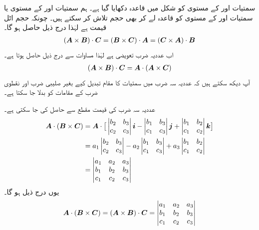 سمتیات  اور  کے مستوی کو شکل  میں قاعدہ دکھایا گیا ہے۔ ہم
سمتیات  اور  کے مستوی یا  سمتیات  اور  کے مستوی کو قاعدہ لے کر بھی حجم تلاش کر سکتے ہیں۔ چونکہ حجم اٹل قیمت ہے لہٰذا درج ذیل حاصل ہو گا۔
\begin{align}\label{مساوات_سمتیہ_حجم_کی_مساوات}
({{\boldsymbol{A}}}\times{\ensuremath{{\boldsymbol{B}}}})\cdot{\ensuremath{{\boldsymbol{C}}}}=({{\boldsymbol{B}}}\times{\ensuremath{{\boldsymbol{C}}}})\cdot{\ensuremath{{\boldsymbol{A}}}}=({{\boldsymbol{C}}}\times{\ensuremath{{\boldsymbol{A}}}})\cdot{\ensuremath{{\boldsymbol{B}}}}
\end{align}
اب عددیہ ضرب تعویضی ہے لہٰذا مساوات  سے درج ذیل حاصل ہوتا ہے۔
\begin{align}
({{\boldsymbol{A}}}\times{\ensuremath{{\boldsymbol{B}}}})\cdot{\ensuremath{{\boldsymbol{C}}}}={{\boldsymbol{A}}}\cdot({{\boldsymbol{A}}}\times{\ensuremath{{\boldsymbol{C}}}})
\end{align}
آپ دیکھ سکتے ہیں کہ عددیہ سہ ضرب میں سمتیات کا مقام تبدیل کیے بغیر صلیبی ضرب اور نقطوی ضرب کے مقامات کو بدلا جا سکتا ہے۔

عددیہ سہ ضرب کی قیمت مقطع سے حاصل کی جا سکتی ہے۔
\begin{align*}
{\ensuremath{{\boldsymbol{A}}}}\cdot({{\boldsymbol{B}}}\times{\ensuremath{{\boldsymbol{C}}}})&={{\boldsymbol{A}}}\cdot\big[ \begin{vmatrix}  b_2&b_3\\c_2&c_3\end{vmatrix}{\boldsymbol{i}}-\begin{vmatrix}b_1&b_3\\c_1&c_3\end{vmatrix}{\boldsymbol{j}}+\begin{vmatrix}b_1&b_2\\c_1&c_2\end{vmatrix}{\boldsymbol{k}}\big]\\
&=a_1\begin{vmatrix}  b_2&b_3\\c_2&c_3\end{vmatrix}-a_2\begin{vmatrix}b_1&b_3\\c_1&c_3\end{vmatrix}+a_3\begin{vmatrix}b_1&b_2\\c_1&c_2\end{vmatrix}\\
&=\begin{vmatrix}a_1&a_2&a_3\\b_1&b_2&b_3\\c_1&c_2&c_3\end{vmatrix}
\end{align*}
یوں درج ذیل ہو گا۔
\begin{align}
{\ensuremath{{\boldsymbol{A}}}}\cdot({{\boldsymbol{B}}}\times{\ensuremath{{\boldsymbol{C}}}})=({{\boldsymbol{A}}}\times{\ensuremath{{\boldsymbol{B}}}})\cdot{\ensuremath{{\boldsymbol{C}}}}=\begin{vmatrix}a_1&a_2&a_3\\b_1&b_2&b_3\\c_1&c_2&c_3\end{vmatrix}
\end{align}

